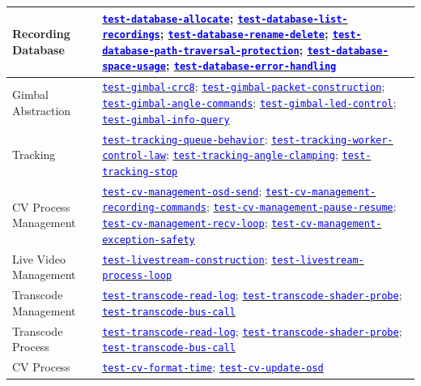 \documentclass[12pt, titlepage]{article}
\newcommand{\tid}[1]{\hyperlink{tid:#1}{\textcolor{blue}{\texttt{#1}}}}
\begin{document}
\begin{longtable}{|p{4.5cm}|p{10cm}|}
  \hline
  Recording Database              & \tid{test-database-allocate}; \tid{test-database-list-recordings}; \tid{test-database-rename-delete}; \tid{test-database-path-traversal-protection}; \tid{test-database-space-usage}; \tid{test-database-error-handling}                                                                  \\
  \hline
  Gimbal Abstraction              & \tid{test-gimbal-crc8}; \tid{test-gimbal-packet-construction}; \tid{test-gimbal-angle-commands}; \tid{test-gimbal-led-control}; \tid{test-gimbal-info-query}                                                                                                                              \\
  \hline
  Tracking                        & \tid{test-tracking-queue-behavior}; \tid{test-tracking-worker-control-law}; \tid{test-tracking-angle-clamping}; \tid{test-tracking-stop}                                                                                                                                                  \\
  \hline
  CV Process Management           & \tid{test-cv-management-osd-send}; \tid{test-cv-management-recording-commands}; \tid{test-cv-management-pause-resume}; \tid{test-cv-management-recv-loop}; \tid{test-cv-management-exception-safety}                                                                                      \\
  \hline
  Live Video Management           & \tid{test-livestream-construction}; \tid{test-livestream-process-loop}                                                                                                                                                                                                                    \\
  \hline
  Transcode Management            & \tid{test-transcode-read-log}; \tid{test-transcode-shader-probe}; \tid{test-transcode-bus-call}                                                                                                                                                                                           \\
  \hline
  Transcode Process               & \tid{test-transcode-read-log}; \tid{test-transcode-shader-probe}; \tid{test-transcode-bus-call}                                                                                                                                                                                           \\
  \hline
  CV Process                      & \tid{test-cv-format-time}; \tid{test-cv-update-osd}                                                                                                                                                                                                                                       \\

\end{longtable}
\end{document}
